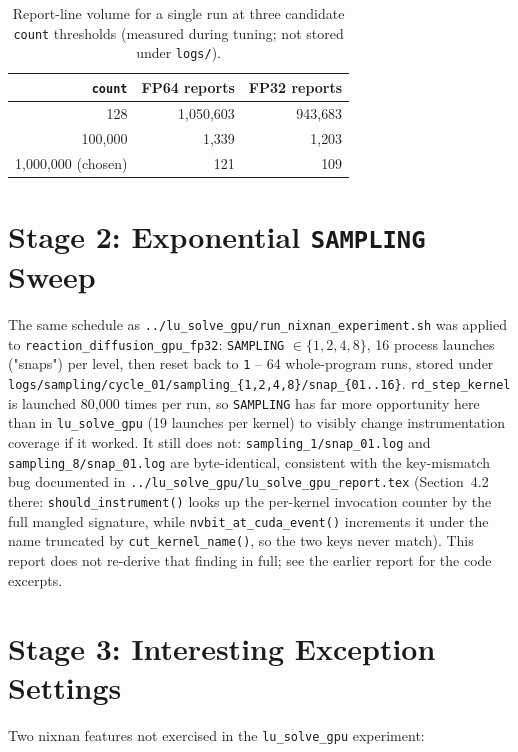 \documentclass[11pt,a4paper]{article}
\begin{document}
\begin{table}[ht]
\centering
\begin{tabular}{rrr}
\toprule
\texttt{count} & FP64 reports & FP32 reports \\
\midrule
128 & 1{,}050{,}603 & 943{,}683 \\
100{,}000 & 1{,}339 & 1{,}203 \\
1{,}000{,}000 (chosen) & 121 & 109 \\
\bottomrule
\end{tabular}
\caption{Report-line volume for a single run at three candidate
\texttt{count} thresholds (measured during tuning; not stored under
\texttt{logs/}).}
\label{tab:count-tuning}
\end{table}

\section{Stage 2: Exponential \texttt{SAMPLING} Sweep}
\label{sec:sampling}

The same schedule as \texttt{../lu\_solve\_gpu/run\_nixnan\_experiment.sh}
was applied to \texttt{reaction\_diffusion\_gpu\_fp32}: \texttt{SAMPLING}
$\in\{1,2,4,8\}$, 16 process launches ("snaps") per level, then reset back
to \texttt{1} -- 64 whole-program runs, stored under
\texttt{logs/sampling/cycle\_01/sampling\_\{1,2,4,8\}/snap\_\{01..16\}}.
\texttt{rd\_step\_kernel} is launched 80{,}000 times per run, so
\texttt{SAMPLING} has far more opportunity here than in
\texttt{lu\_solve\_gpu} (19 launches per kernel) to visibly change
instrumentation coverage if it worked. It still does not:
\texttt{sampling\_1/snap\_01.log} and \texttt{sampling\_8/snap\_01.log} are
byte-identical, consistent with the key-mismatch bug documented in
\texttt{../lu\_solve\_gpu/lu\_solve\_gpu\_report.tex}
(Section~4.2 there: \texttt{should\_instrument()} looks up the per-kernel
invocation counter by the full mangled signature, while
\texttt{nvbit\_at\_cuda\_event()} increments it under the name truncated by
\texttt{cut\_kernel\_name()}, so the two keys never match). This report does
not re-derive that finding in full; see the earlier report for the code
excerpts.

\section{Stage 3: Interesting Exception Settings}
\label{sec:stage3}

Two nixnan features not exercised in the \texttt{lu\_solve\_gpu} experiment:
\end{document}
